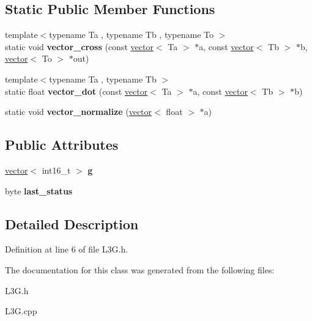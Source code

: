 \subsection*{Static Public Member Functions}
\begin{DoxyCompactItemize}
\item 
\mbox{\label{class_l3_g_a3bb8e9c82e6a9bd8f1da42ca287ec120}} 
{\footnotesize template$<$typename Ta , typename Tb , typename To $>$ }\\static void {\bfseries vector\+\_\+cross} (const \hyperlink{struct_l3_g_1_1vector}{vector}$<$ Ta $>$ $\ast$a, const \hyperlink{struct_l3_g_1_1vector}{vector}$<$ Tb $>$ $\ast$b, \hyperlink{struct_l3_g_1_1vector}{vector}$<$ To $>$ $\ast$out)
\item 
\mbox{\label{class_l3_g_ac58624a8651cf3e66ea884510e9d8e73}} 
{\footnotesize template$<$typename Ta , typename Tb $>$ }\\static float {\bfseries vector\+\_\+dot} (const \hyperlink{struct_l3_g_1_1vector}{vector}$<$ Ta $>$ $\ast$a, const \hyperlink{struct_l3_g_1_1vector}{vector}$<$ Tb $>$ $\ast$b)
\item 
\mbox{\label{class_l3_g_adb9bb06f0fc8c8d0879236a87466e1b7}} 
static void {\bfseries vector\+\_\+normalize} (\hyperlink{struct_l3_g_1_1vector}{vector}$<$ float $>$ $\ast$a)
\end{DoxyCompactItemize}
\subsection*{Public Attributes}
\begin{DoxyCompactItemize}
\item 
\mbox{\label{class_l3_g_ab1cd0fd8c8f23e0f3ab1c6ce35f14324}} 
\hyperlink{struct_l3_g_1_1vector}{vector}$<$ int16\+\_\+t $>$ {\bfseries g}
\item 
\mbox{\label{class_l3_g_a3a233a1c4c0421acabdc62a3e22d3272}} 
byte {\bfseries last\+\_\+status}
\end{DoxyCompactItemize}


\subsection{Detailed Description}


Definition at line 6 of file L3\+G.\+h.



The documentation for this class was generated from the following files\+:\begin{DoxyCompactItemize}
\item 
L3\+G.\+h\item 
L3\+G.\+cpp\end{DoxyCompactItemize}
